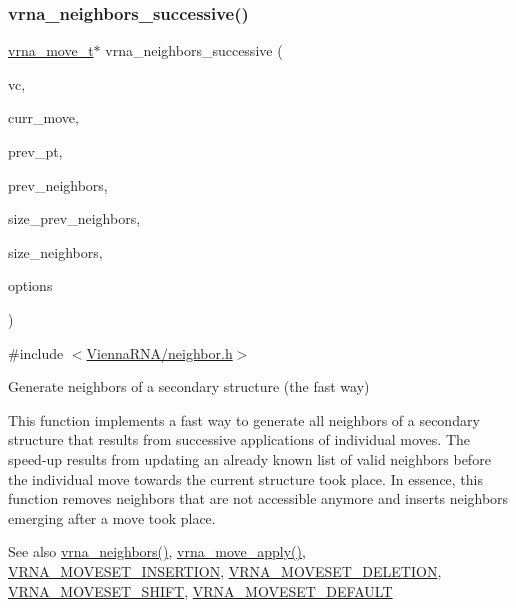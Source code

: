\subsubsection{\texorpdfstring{vrna\+\_\+neighbors\+\_\+successive()}{vrna\_neighbors\_successive()}}
{\footnotesize\ttfamily \mbox{\hyperlink{group__neighbors_ga08630e00206cd163ea29c462bf5f4755}{vrna\+\_\+move\+\_\+t}}$\ast$ vrna\+\_\+neighbors\+\_\+successive (\begin{DoxyParamCaption}\item[{const \mbox{\hyperlink{group__fold__compound_ga1b0cef17fd40466cef5968eaeeff6166}{vrna\+\_\+fold\+\_\+compound\+\_\+t}} $\ast$}]{vc,  }\item[{const \mbox{\hyperlink{group__neighbors_ga08630e00206cd163ea29c462bf5f4755}{vrna\+\_\+move\+\_\+t}} $\ast$}]{curr\+\_\+move,  }\item[{const short $\ast$}]{prev\+\_\+pt,  }\item[{const \mbox{\hyperlink{group__neighbors_ga08630e00206cd163ea29c462bf5f4755}{vrna\+\_\+move\+\_\+t}} $\ast$}]{prev\+\_\+neighbors,  }\item[{int}]{size\+\_\+prev\+\_\+neighbors,  }\item[{int $\ast$}]{size\+\_\+neighbors,  }\item[{unsigned int}]{options }\end{DoxyParamCaption})}



{\ttfamily \#include $<$\mbox{\hyperlink{neighbor_8h}{Vienna\+R\+N\+A/neighbor.\+h}}$>$}



Generate neighbors of a secondary structure (the fast way) 

This function implements a fast way to generate all neighbors of a secondary structure that results from successive applications of individual moves. The speed-\/up results from updating an already known list of valid neighbors before the individual move towards the current structure took place. In essence, this function removes neighbors that are not accessible anymore and inserts neighbors emerging after a move took place.

\begin{DoxySeeAlso}{See also}
\mbox{\hyperlink{group__neighbors_gab1473d856b15da2120fe648977798ad5}{vrna\+\_\+neighbors()}}, \mbox{\hyperlink{group__neighbors_gacdbc5f609b46aeb07d2c7e015677a1e0}{vrna\+\_\+move\+\_\+apply()}}, \mbox{\hyperlink{group__neighbors_gaf39028db9c70d3be528929182a3f2d5a}{V\+R\+N\+A\+\_\+\+M\+O\+V\+E\+S\+E\+T\+\_\+\+I\+N\+S\+E\+R\+T\+I\+ON}}, \mbox{\hyperlink{group__neighbors_gac05db9392c6647e3e9a6982096c5b384}{V\+R\+N\+A\+\_\+\+M\+O\+V\+E\+S\+E\+T\+\_\+\+D\+E\+L\+E\+T\+I\+ON}}, \mbox{\hyperlink{group__neighbors_ga68ea27c81de4b74e48b775c04052590b}{V\+R\+N\+A\+\_\+\+M\+O\+V\+E\+S\+E\+T\+\_\+\+S\+H\+I\+FT}}, \mbox{\hyperlink{group__neighbors_gaa5ffec4dd0d02df320f123e6888154d1}{V\+R\+N\+A\+\_\+\+M\+O\+V\+E\+S\+E\+T\+\_\+\+D\+E\+F\+A\+U\+LT}}
\end{DoxySeeAlso}

